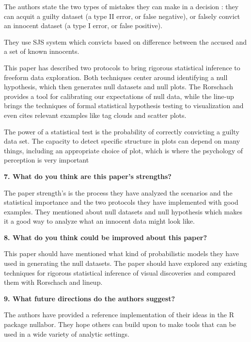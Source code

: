 \documentclass{article}[12pt]
\begin{document}
{
   The authors state the two types of mistakes they can make in a decision : they can acquit a guilty dataset (a type II error, or false negative), or falsely convict an innocent dataset (a type I error, or false positive). 
   
   They use SJS system which convicts based on difference between the accused and a set of known innocents.
   
   This paper has described two protocols to bring rigorous statistical inference to freeform data exploration. Both techniques center around identifying a null hypothesis, which then generates null datasets and null plots. The Rorschach provides a tool for calibrating our expectations of null data, while the line-up brings the techniques of formal statistical hypothesis testing to visualization and even cites relevant examples like tag clouds and scatter plots.
   
   The power of a statistical test is the probability of correctly convicting a guilty data set. The capacity to detect specific structure in plots can depend on many things, including an appropriate choice of plot, which is where the psychology of perception is very important
    
}



\vspace{2ex}\noindent
{\bf 7. What do you think are this paper's strengths? }

{
    The paper strength's is the process they have analyzed the scenarios and the statistical importance and the two protocols they have implemented with good examples. They mentioned about null datasets and null hypothesis which makes it a good way to analyze what an innocent data might look like. 

}

\vspace{2ex}\noindent
{\bf 8. What do you think could be improved about this paper? }

{
    This paper should have mentioned what kind of probabilistic models they have used in generating the null datasets. The paper should have explored any existing techniques for rigorous statistical inference of visual discoveries and compared them with Rorschach and lineup. 
}

\vspace{2ex}\noindent
{\bf 9. What future directions do the authors suggest?}

{
    The authors have provided a reference implementation of their ideas in the R package nullabor. They hope others can build upon to make tools that can be used in a wide variety of analytic settings.
}
\end{document}
